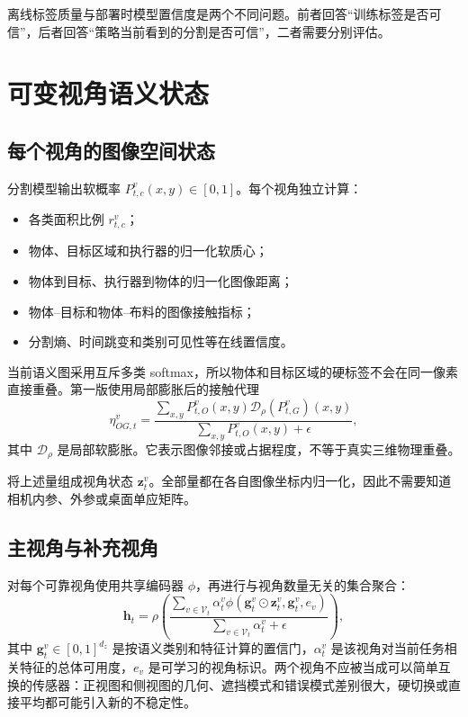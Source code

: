 \documentclass[UTF8,a4paper,11pt]{ctexart}
\begin{document}
离线标签质量与部署时模型置信度是两个不同问题。前者回答“训练标签是否可信”，后者回答“策略当前看到的分割是否可信”，二者需要分别评估。

\section{可变视角语义状态}

\subsection{每个视角的图像空间状态}

分割模型输出软概率 $P_{t,c}^{v}(x,y)\in[0,1]$。每个视角独立计算：
\begin{itemize}[leftmargin=2.3em]
  \item 各类面积比例 $r_{t,c}^{v}$；
  \item 物体、目标区域和执行器的归一化软质心；
  \item 物体到目标、执行器到物体的归一化图像距离；
  \item 物体--目标和物体--布料的图像接触指标；
  \item 分割熵、时间跳变和类别可见性等在线置信度。
\end{itemize}

当前语义图采用互斥多类 softmax，所以物体和目标区域的硬标签不会在同一像素直接重叠。第一版使用局部膨胀后的接触代理
\begin{equation}
\eta_{OG,t}^{v}=
\frac{\sum_{x,y}P_{t,O}^{v}(x,y)
\mathcal D_{\rho}(P_{t,G}^{v})(x,y)}
{\sum_{x,y}P_{t,O}^{v}(x,y)+\epsilon},
\end{equation}
其中 $\mathcal D_{\rho}$ 是局部软膨胀。它表示图像邻接或占据程度，不等于真实三维物理重叠。

将上述量组成视角状态 $\bm z_t^v$。全部量都在各自图像坐标内归一化，因此不需要知道相机内参、外参或桌面单应矩阵。

\subsection{主视角与补充视角}

对每个可靠视角使用共享编码器 $\phi$，再进行与视角数量无关的集合聚合：
\begin{equation}
\bm h_t=\rho\left(
\frac{\sum_{v\in\mathcal V_t}\alpha_t^v
\phi(\bm g_t^v\odot\bm z_t^v,\bm g_t^v,e_v)}
{\sum_{v\in\mathcal V_t}\alpha_t^v+\epsilon}
\right),
\end{equation}
其中 $\bm g_t^v\in[0,1]^{d_z}$ 是按语义类别和特征计算的置信门，$\alpha_t^v$ 是该视角对当前任务相关特征的总体可用度，$e_v$ 是可学习的视角标识。两个视角不应被当成可以简单互换的传感器：正视图和侧视图的几何、遮挡模式和错误模式差别很大，硬切换或直接平均都可能引入新的不稳定性。
\end{document}
